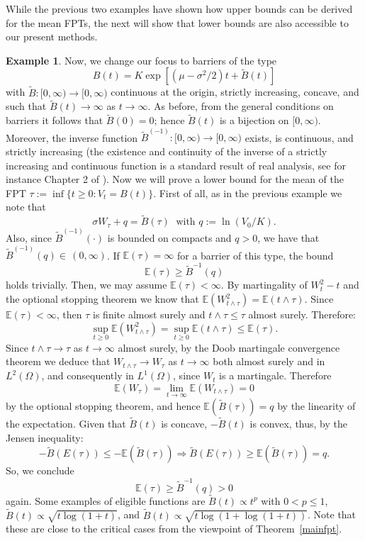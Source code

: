 \documentclass[12pt]{article}
\theoremstyle{definition}
\newtheorem{example}{Example}[theorem]
\begin{document}
While the previous two examples have shown how upper bounds can be derived for the mean FPTs, the next will show that lower bounds are also accessible to our present methods. 

\begin{example}
Now, we change our focus to barriers of the type
$$
B(t)=K\exp\left[(\mu-\sigma^2/2)t+\tilde{B}(t)\right]
$$
with $\tilde{B}:[0,\infty)\rightarrow [0,\infty)$ continuous at the origin, strictly increasing, concave, and such that $\tilde{B}(t) \to \infty$ as $t \to \infty$. As before, from the general conditions on barriers it follows that $\tilde{B}(0)=0$; hence $\tilde{B}(t)$ is a bijection on $[0,\infty)$. Moreover, the inverse function $\tilde{B}^{(-1)}:[0,\infty)\rightarrow [0,\infty)$ exists, is continuous, and strictly increasing (the existence and continuity of the inverse of a strictly increasing and continuous function is a standard result of real analysis, see for instance Chapter 2 of \cite{royden2010real}). Now we will prove a lower bound for the mean of the FPT $\tau:=\inf\lbrace t\geq 0 : V_t=B(t)\rbrace$. First of all, as in the previous example we note that
$$
\sigma W_\tau+q=\tilde{B}(\tau) \; \text{ with }q:=\ln\left( V_0/K \right).
$$
Also, since $\tilde{B}^{(-1)}(\cdot)$ is bounded on compacts and $q>0$, we have that $\tilde{B}^{(-1)}(q) \in \, (0,\infty)$. If $\mathbb{E}(\tau)=\infty$ for a barrier of this type, the bound
$$
\mathbb{E}(\tau)\geq{\tilde{B}}^{-1}(q)
$$
holds trivially. Then, we may assume $\mathbb{E}(\tau) < \infty$. By martingality of $W_t^2-t$ and the optional stopping theorem we know that
$\mathbb{E}(W_{t\wedge\tau}^2)=\mathbb{E}(t\wedge\tau)$. Since $\mathbb{E}(\tau) < \infty$, then $\tau$ is finite almost surely and $t \wedge \tau \le \tau$ almost surely. Therefore:
$$
\sup_{t \ge 0} \mathbb{E} (W_{t\wedge\tau}^2)=\sup_{t \ge 0} \mathbb{E}(t\wedge\tau) \le \mathbb{E}(\tau).
$$
Since $t \wedge \tau \to \tau$ as $t \to \infty$ almost surely, by the Doob martingale convergence theorem we deduce that $W_{t \wedge \tau} \to W_\tau$ as $t \to \infty$ both almost surely and in $L^2(\Omega)$, and consequently in $L^1(\Omega)$, since $W_t$ is a martingale. Therefore
$$
\mathbb{E}(W_{\tau}) = \lim_{t \to \infty} \mathbb{E}(W_{t \wedge \tau}) = 0
$$
by the optional stopping theorem, and hence $\mathbb{E}(\tilde{B}(\tau))=q$ by the linearity of the expectation. Given that $\tilde{B}(t)$ is concave, $-\tilde{B}(t)$ is convex, thus, by the Jensen inequality:
$$
-\tilde{B}(E(\tau))\leq-\mathbb{E}(\tilde{B}(\tau))\Rightarrow \tilde{B}(E(\tau))\geq\mathbb{E}(\tilde{B}(\tau))=q.
$$
So, we conclude
$$
\mathbb{E}(\tau)\geq{\tilde{B}}^{-1}(q)>0
$$
again. Some examples of eligible functions are $\tilde{B}(t) \propto t^p$ with $0 < p \le 1$,  $\tilde{B}(t)\propto \sqrt{t\log(1+t)}$, and $\tilde{B}(t)\propto \sqrt{t\log(1+\log(1+t))}$. Note that these are close to the critical cases from the viewpoint of Theorem~\ref{mainfpt}.


\end{example}
\end{document}

